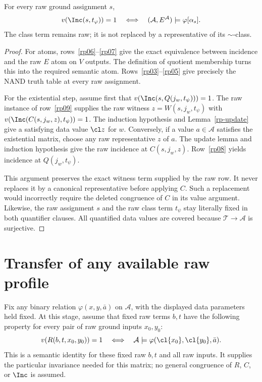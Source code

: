 \begin{lemma}\label{rp-truth}
For every raw ground assignment $s$,
\[
 v(\Inc(s,t_\varphi))=1
 \quad\Longleftrightarrow\quad
 (\mathcal A,E^{\mathcal A})\models\varphi[\alpha_s].
\]
The class term remains raw; it is not replaced by a representative of
its $\sim$-class.
\end{lemma}
\begin{proof}
For atoms, rows~\ref{rp06}--\ref{rp07} give the exact equivalence
between incidence and the raw $E$ atom on $V$ outputs. The definition
of quotient membership turns this into the required semantic atom.
Rows~\ref{rp03}--\ref{rp05} give precisely the NAND truth table at
every raw assignment.

For the existential step, assume first that
$v(\Inc(s,Q(j_w,t_\psi)))=1$. The raw instance of row~\ref{rp09}
supplies the raw witness
$z=W(s,j_w,t_\psi)$ with
$v(\Inc(C(s,j_w,z),t_\psi))=1$. The induction hypothesis and
Lemma~\ref{rp-update} give a satisfying data value $\cl z$ for $w$.
Conversely, if a value $a\in\mathcal A$ satisfies the existential
matrix, choose any raw representative $z$ of $a$. The update lemma
and induction hypothesis give the raw incidence at $C(s,j_w,z)$.
Row~\ref{rp08} yields incidence at $Q(j_w,t_\psi)$.

This argument preserves the exact witness term supplied by the raw
row. It never replaces it by a canonical representative before applying
$C$. Such a replacement would incorrectly require the deleted
congruence of $C$ in its value argument. Likewise, the raw assignment
$s$ and the raw class term $t_\psi$ stay literally fixed in both
quantifier clauses. All quantified data values are covered because
$\mathcal T\to\mathcal A$ is surjective.
\end{proof}

\section{Transfer of any available raw profile}

Fix any binary relation $\varphi(x,y,\bar a)$ on $\mathcal A$, with
the displayed data parameters held fixed. At this stage, assume that
fixed raw terms $b,t$ have the following property for every pair of raw
ground inputs $x_0,y_0$:
\begin{equation}\label{rp-Rtruth}
 v(R(b,t,x_0,y_0))=1
 \quad\Longleftrightarrow\quad
 \mathcal A\models\varphi(\cl{x_0},\cl{y_0},\bar a).
\end{equation}
This is a semantic identity for these fixed raw $b,t$ and all raw
inputs. It supplies the particular invariance needed for this matrix;
no general congruence of $R$, $C$, or $\Inc$ is assumed.

